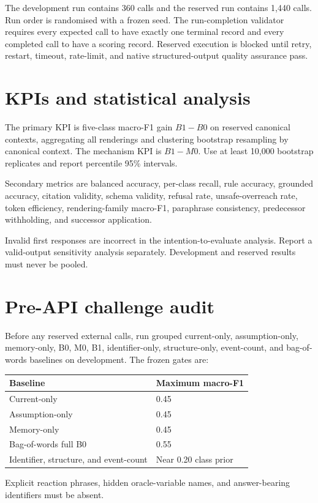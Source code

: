 \documentclass[10.5pt]{article}
\begin{document}
The development run contains 360 calls and the reserved run contains 1,440 calls. Run order is randomised with a frozen seed. The run-completion validator requires every expected call to have exactly one terminal record and every completed call to have a scoring record. Reserved execution is blocked until retry, restart, timeout, rate-limit, and native structured-output quality assurance pass.

\section{KPIs and statistical analysis}
The primary KPI is five-class macro-F1 gain $B1-B0$ on reserved canonical contexts, aggregating all renderings and clustering bootstrap resampling by canonical context. The mechanism KPI is $B1-M0$. Use at least 10,000 bootstrap replicates and report percentile 95\% intervals.

Secondary metrics are balanced accuracy, per-class recall, rule accuracy, grounded accuracy, citation validity, schema validity, refusal rate, unsafe-overreach rate, token efficiency, rendering-family macro-F1, paraphrase consistency, predecessor withholding, and successor application.

Invalid first responses are incorrect in the intention-to-evaluate analysis. Report a valid-output sensitivity analysis separately. Development and reserved results must never be pooled.

\section{Pre-API challenge audit}
Before any reserved external calls, run grouped current-only, assumption-only, memory-only, B0, M0, B1, identifier-only, structure-only, event-count, and bag-of-words baselines on development. The frozen gates are:
\begin{longtable}{p{}p{}}
\toprule\textbf{Baseline}&\textbf{Maximum macro-F1}\\\midrule
Current-only & 0.45\\
Assumption-only & 0.45\\
Memory-only & 0.45\\
Bag-of-words full B0 & 0.55\\
Identifier, structure, and event-count & Near 0.20 class prior\\
\bottomrule
\end{longtable}
Explicit reaction phrases, hidden oracle-variable names, and answer-bearing identifiers must be absent.
\end{document}
